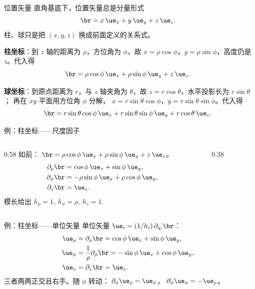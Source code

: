 \documentclass[fontset=windows, chinese, 10pt, xcolor=dvipsnames]{beamer}
\begin{document}

\begin{frame}{位置矢量}
  直角基底下，位置矢量总是分量形式
  \begin{equation*}
    \br=x\,\ue_x+y\,\ue_y+z\,\ue_z.
  \end{equation*}
  柱、球只是把 $(x,y,z)$ 换成前面定义的关系式。

  \medskip
  \textbf{柱坐标}：到 $z$ 轴的距离为 $\rho$，方位角为 $\phi$，故
  $x=\rho\cos\phi$，$y=\rho\sin\phi$，高度仍是 $z$。代入得
  \begin{equation*}
    \br=\rho\cos\phi\,\ue_x+\rho\sin\phi\,\ue_y+z\,\ue_z.
  \end{equation*}

  \medskip
  \textbf{球坐标}：到原点距离为 $r$，与 $z$ 轴夹角为 $\theta$，故
  $z=r\cos\theta$，水平投影长为 $r\sin\theta$；
  再在 $xy$ 平面用方位角 $\phi$ 分解，
  $x=r\sin\theta\cos\phi$，$y=r\sin\theta\sin\phi$。代入得
  \begin{equation*}
    \br=r\sin\theta\cos\phi\,\ue_x
    +r\sin\theta\sin\phi\,\ue_y
    +r\cos\theta\,\ue_z.
  \end{equation*}
\end{frame}

\begin{frame}{例：柱坐标——尺度因子}
  \begin{columns}[T]
    \begin{column}{0.58\textwidth}
      {\small
      如前：
      $\br=\rho\cos\phi\,\ue_x+\rho\sin\phi\,\ue_y+z\,\ue_z$。
      \begin{align*}
        \partial_\rho\br&=\cos\phi\,\ue_x+\sin\phi\,\ue_y,\\
        \partial_\phi\br&=-\rho\sin\phi\,\ue_x+\rho\cos\phi\,\ue_y,\\
        \partial_z\br&=\ue_z.
      \end{align*}
      模长给出
      $\boxed{h_{\rho}=1,\ h_{\phi}=\rho,\ h_z=1.}$}
    \end{column}
    \begin{column}{0.38\textwidth}
      \centering
      \scalebox{0.88}{}
    \end{column}
  \end{columns}
\end{frame}

\begin{frame}{例：柱坐标——单位矢量}
  单位矢量 $\ue_i=(1/h_i)\,\partial_{q_i}\br$：
  \begin{align*}
    \ue_{\rho}
    &=\partial_\rho\br
    =\cos\phi\,\ue_x+\sin\phi\,\ue_y,\\
    \ue_{\phi}
    &=\frac{1}{\rho}\partial_\phi\br
    =-\sin\phi\,\ue_x+\cos\phi\,\ue_y,\\
    \ue_z
    &=\partial_z\br
    =\ue_z.
  \end{align*}
  三者两两正交且右手。随 $\phi$ 转动：
  $\partial_\phi\ue_{\rho}=\ue_{\phi}$，
  $\partial_\phi\ue_{\phi}=-\ue_{\rho}$。
\end{frame}
\end{document}
